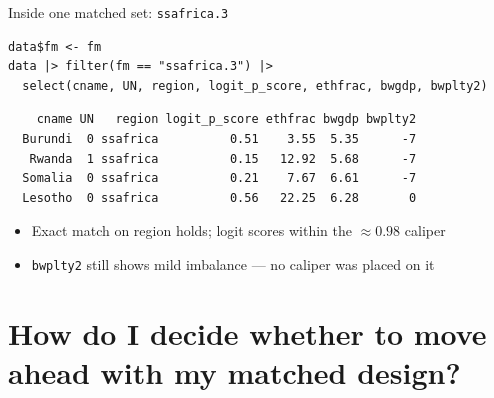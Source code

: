 \documentclass[table, xcolor = {dvipsnames}, 9pt]{beamer}
\theoremstyle{plain}
\begin{document}
\begin{frame}[fragile]{Inside one matched set: \texttt{ssafrica.3}}
\begin{lstlisting}[style=Rstyle, basicstyle=\ttfamily\scriptsize, frame=single]
data$fm <- fm
data |> filter(fm == "ssafrica.3") |>
  select(cname, UN, region, logit_p_score, ethfrac, bwgdp, bwplty2)
\end{lstlisting}
\footnotesize
\begin{verbatim}
    cname UN   region logit_p_score ethfrac bwgdp bwplty2
  Burundi  0 ssafrica          0.51    3.55  5.35      -7
   Rwanda  1 ssafrica          0.15   12.92  5.68      -7
  Somalia  0 ssafrica          0.21    7.67  6.61      -7
  Lesotho  0 ssafrica          0.56   22.25  6.28       0
\end{verbatim}
\normalsize
\begin{itemize}
\item Exact match on region holds; logit scores within the $\approx 0.98$ caliper \vfill
\item \texttt{bwplty2} still shows mild imbalance --- no caliper was placed on it \vfill
\end{itemize}
\end{frame}
\section{How do I decide whether to move ahead with my matched design?}
\end{document}
